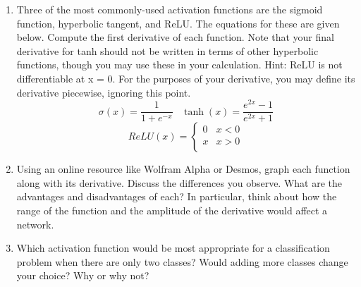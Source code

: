 \begin{exercise}

    \begin{enumerate}
    \item Three of the most commonly-used activation functions are the sigmoid function, hyperbolic tangent, and ReLU.  The equations for these are given below.  Compute the first derivative of each function.  Note that your final derivative for tanh should not be written in terms of other hyperbolic functions, though you may use these in your calculation. Hint: ReLU is not differentiable at x = 0.  For the purposes of your derivative, you may define its derivative piecewise, ignoring this point.
    \[\sigma(x) = \frac{1}{1+e^{-x}}\,\,\,\,\,\tanh(x) = \frac{e^{2x} - 1}{e^{2x} + 1}\]
    \[ReLU(x) =   \left\{
\begin{array}{ll}
      0 & x < 0 \\
      x & x > 0 \\
\end{array} 
\right. \]
    
    \item Using an online resource like Wolfram Alpha or Desmos, graph each function along with its derivative.  Discuss the differences you observe.  What are the advantages and disadvantages of each?  In particular, think about how the range of the function and the amplitude of the derivative would affect a network.
    
    \item Which activation function would be most appropriate for a classification problem when there are only two classes?  Would adding more classes change your choice?  Why or why not?
  \end{enumerate}
    
\end{exercise}


